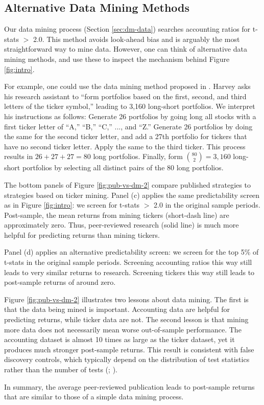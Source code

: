 \subsection{Alternative Data Mining Methods}\label{sec:pubvs-alt}

Our data mining process (Section \ref{sec:dm-data}) searches accounting ratios for t-stats $>$ 2.0. This method avoids look-ahead bias and is arguably the most straightforward way to mine data. However, one can think of alternative data mining methods, and use these to inspect the mechanism behind Figure \ref{fig:intro}. 

For example, one could use the data mining method proposed in \citet{harvey2017presidential}. Harvey asks his research assistant to ``form portfolios based on the first, second, and third letters of the ticker symbol,'' leading to 3,160 long-short portfolios. We interpret his instructions as follows:  Generate 26 portfolios by going long all stocks with a  first ticker letter of ``A,'' ``B,'' ``C,'' ..., and ``Z.''  Generate 26 portfolios by doing the same for the second ticker letter, and add a 27th portfolio for tickers that have no second ticker letter.  Apply the same to the third ticker.  This process results in $26 + 27 + 27 = 80$ long portfolios.  Finally, form $\binom{80}{2} = 3,160$ long-short portfolios by selecting all distinct pairs of the 80 long portfolios.  

The bottom panels of Figure \ref{fig:pub-vs-dm-2} compare published strategies to strategies based on ticker mining. Panel (c) applies the same predictability screen as in Figure \ref{fig:intro}: we screen for t-stats $>$ 2.0 in the original sample periods. Post-sample, the mean returns from mining tickers (short-dash line) are approximately zero. Thus, peer-reviewed research (solid line) is much more helpful for predicting returns than mining tickers. 

Panel (d) applies an alternative predictability screen: we screen for the top 5\% of t-stats in the original sample periods. Screening accounting ratios this way still leads to very similar returns to research. Screening tickers this way still leads to post-sample returns of around zero.

Figure \ref{fig:pub-vs-dm-2} illustrates two lessons about data mining. The first is that the data being mined is important. Accounting data are helpful for predicting returns, while ticker data are not. The second lesson is that mining more data does not necessarily mean worse out-of-sample performance. The accounting dataset is almost 10 times as large as the ticker dataset, yet it produces much stronger post-sample returns.  This result is consistent with false discovery controls, which typically depend on the distribution of test statistics rather than the number of tests (\citealt{benjamini1995controlling}; \citealt{chen2025t}).

In summary, the average peer-reviewed publication leads to post-sample returns that are similar to those of a simple data mining process.

